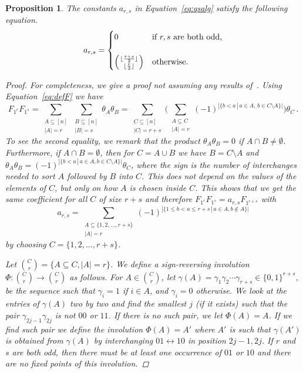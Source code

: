 \documentclass[11pt,oneside]{amsart}
\newtheorem{prop}[theorem]{Proposition}
\theoremstyle{definition}
\numberwithin{equation}{section}
\begin{document}
\begin{prop}\label{prop:comm}
The constants $a_{r,s}$ in Equation~\eqref{eq:qsalg} satisfy the following equation.
$$ a_{r,s}=
\begin{cases}
	0  &\text{if $r,s$ are both odd,}\\
	\\
	\left({\lfloor \frac{r+s}{2} \rfloor \atop \lfloor \frac{r}{2} \rfloor}\right)&\text{otherwise.}
\end{cases}
$$

\begin{proof}
For completeness, we give a proof not assuming any results of~\cite{FLP}. Using Equation~\eqref{eq:defF} we have
$$F_{1^r}F_{1^s}= \sum_{\substack{A \subseteq [n]\\|A|=r}}  \sum_{\substack{B \subseteq [n]\\|B|=s}} \theta_A \theta_B
= \sum_{\substack{C \subseteq [n]\\|C|=r+s}} \Big(\sum_{\substack{A\subseteq C \\|A|=r}} (-1)^{|\{b<a\,|\,a\in A,\, b\in C\setminus A\}|} \Big) \theta_C\,.
$$
To see the second equality, we remark that the product $\theta_A\theta_B=0$ if $A\cap B\ne \emptyset$.
Furthermore, if $A\cap B= \emptyset$, then for $C=A\cup B$
we have $B=C\setminus A$ and  $\theta_A\theta_B=(-1)^{|\{b<a\,|\,a\in A, b\in C\setminus A\}|} \theta_C$,
where the sign is the number of interchanges needed to sort $A$ followed by $B$ into $C$.
This does not depend on the values of the elements of $C$, but only on how $A$ is chosen inside $C$.
This shows that we get the same coefficient for all $C$ of size $r+s$ and therefore
$F_{1^r} F_{1^s} = a_{r,s} F_{1^{r+s}}$ with
\begin{equation}\label{eq:signa}
a_{r,s}=\sum_{\substack{A\subseteq \{1,2,\ldots, r+s\}\\ |A|=r}}
(-1)^{|\{1\le b<a\le r+s\,|\,a\in A, b\not\in A\}|}
\end{equation}
by choosing $C=\{1,2,\ldots,r+s\}$.

Let ${C\choose r}=\{A\subseteq C, |A|=r\}$. We define a sign-reversing involution $\Phi\colon {C\choose r}\to{C\choose r}$ as follows.
For $A\in  {C\choose r}$, let $\gamma(A)=\gamma_1\gamma_2\cdots\gamma_{r+s}\in\{0,1\}^{r+s}$, be the sequence such that
 $\gamma_i=1$ if $i\in A$, and $\gamma_i=0$ otherwise.
 We look at the  entries of  $\gamma(A)$ two by two and find the smallest $j$ (if it exists) such that the  pair
 $\gamma_{2j-1}\gamma_{2j}$ is not $00$ or $11$. If there is no such pair, we let $\Phi(A)=A$.   If we find such pair we define the involution $\Phi(A)=A'$ where $A'$ is such that $\gamma(A')$ is obtained from $\gamma(A)$ by interchanging $01\leftrightarrow 10$ in position $2j-1,2j$. If $r$ and $s$ are both odd, then there must be at least one occurrence of $01$ or $10$ and there are no fixed points of this involution.


\end{proof}
\end{prop}
\end{document}
